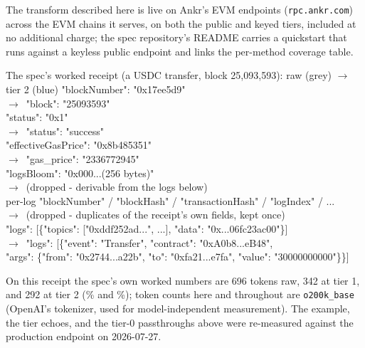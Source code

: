 \documentclass[11pt]{article}
\newcommand{\code}[1]{\texttt{#1}}
\begin{document}
The transform described here is live on Ankr's EVM endpoints (\code{rpc.ankr.com}) across the EVM chains it serves, on both the public and keyed tiers, included at no additional charge; the spec repository's README carries a quickstart that runs against a keyless public endpoint and links the per-method coverage table.

\begin{codebox}{The spec's worked receipt (a USDC transfer, block 25{,}093{,}593): raw (grey) $\to$ tier 2 (blue)}
\textcolor{ankrgrey}{"blockNumber": "0x17ee5d9"}\\
\hspace*{2em}$\to$\ \textcolor{ankrblue}{"block": "25093593"}\\[3pt]
\textcolor{ankrgrey}{"status": "0x1"}\\
\hspace*{2em}$\to$\ \textcolor{ankrblue}{"status": "success"}\\[3pt]
\textcolor{ankrgrey}{"effectiveGasPrice": "0x8b485351"}\\
\hspace*{2em}$\to$\ \textcolor{ankrblue}{"gas\_price": "2336772945"}\\[3pt]
\textcolor{ankrgrey}{"logsBloom": "0x000...(256 bytes)"}\\
\hspace*{2em}$\to$\ \textcolor{ankrblue}{(dropped - derivable from the logs below)}\\[3pt]
\textcolor{ankrgrey}{per-log "blockNumber" / "blockHash" / "transactionHash" / "logIndex" / ...}\\
\hspace*{2em}$\to$\ \textcolor{ankrblue}{(dropped - duplicates of the receipt's own fields, kept once)}\\[3pt]
\textcolor{ankrgrey}{"logs": [\{"topics": ["0xddf252ad...", ...], "data": "0x...06fc23ac00"\}]}\\
\hspace*{2em}$\to$\ \textcolor{ankrblue}{"logs": [\{"event": "Transfer", "contract": "0xA0b8...eB48",}\\
\hspace*{3.5em}\textcolor{ankrblue}{"args": \{"from": "0x2744...a22b", "to": "0xfa21...e7fa", "value": "30000000000"\}\}]}
\end{codebox}

On this receipt the spec's own worked numbers are 696 tokens raw, 342 at tier 1, and 292 at tier 2 (\% and \%); token counts here and throughout are \code{o200k\_base} (OpenAI's tokenizer, used for model-independent measurement). The example, the tier echoes, and the tier-0 passthroughs above were re-measured against the production endpoint on 2026-07-27.
\end{document}
